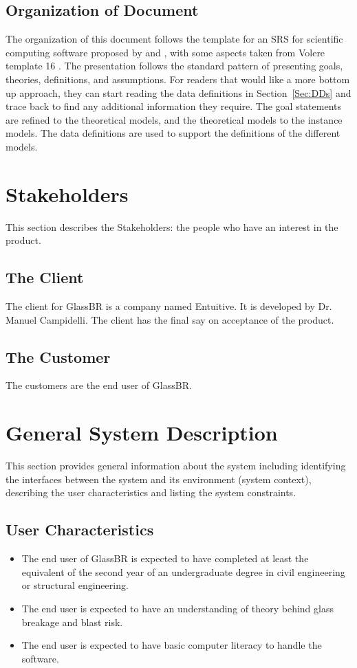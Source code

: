\documentclass[12pt]{article}
\begin{document}
\subsection{Organization of Document}
\label{Sec:DocOrg}
The organization of this document follows the template for an SRS for scientific computing software proposed by \cite{koothoor2013} and \cite{smithLai2005}, with some aspects taken from Volere template 16 \cite{rbrtsn2012}. The presentation follows the standard pattern of presenting goals, theories, definitions, and assumptions. For readers that would like a more bottom up approach, they can start reading the data definitions in Section~\ref{Sec:DDs} and trace back to find any additional information they require.
The goal statements are refined to the theoretical models, and the theoretical models to the instance models. The data definitions are used to support the definitions of the different models.
\section{Stakeholders}
\label{Sec:Stakeholder}
This section describes the Stakeholders: the people who have an interest in the product.
\subsection{The Client}
\label{Sec:Client}
The client for GlassBR is a company named Entuitive. It is developed by Dr. Manuel Campidelli. The client has the final say on acceptance of the product.
\subsection{The Customer}
\label{Sec:Customer}
The customers are the end user of GlassBR.
\section{General System Description}
\label{Sec:GenSysDesc}
This section provides general information about the system including identifying the interfaces between the system and its environment (system context), describing the user characteristics and listing the system constraints.
\subsection{User Characteristics}
\label{Sec:UserChars}
\begin{itemize}
\item{The end user of GlassBR is expected to have completed at least the equivalent of the second year of an undergraduate degree in civil engineering or structural engineering.}
\item{The end user is expected to have an understanding of theory behind glass breakage and blast risk.}
\item{The end user is expected to have basic computer literacy to handle the software.}
\end{itemize}
\end{document}
